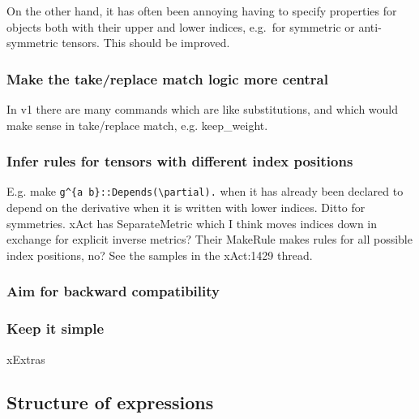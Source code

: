 \documentclass[11pt]{article}
\begin{document}


On the other hand, it has often been annoying having to specify
properties for objects both with their upper and lower indices,
e.g.~for symmetric or anti-symmetric tensors. This should be improved.

\subsubsection{Make the take/replace match logic more central}

In v1 there are many commands which are like substitutions, and which
would make sense in take/replace match, e.g. keep\_weight. 

\subsubsection{Infer rules for tensors with different index positions}

E.g. make \verb|g^{a b}::Depends(\partial).| when it has already been
declared to depend on the derivative when it is written with lower
indices. Ditto for symmetries. xAct has SeparateMetric which I think
moves indices down in exchange for explicit inverse metrics? Their
MakeRule makes rules for all possible index positions, no? See the
samples in the xAct:1429 thread.



\subsubsection{Aim for backward compatibility}


\subsubsection{Keep it simple}


xExtras

\subsection{Structure of expressions}
\end{document}
